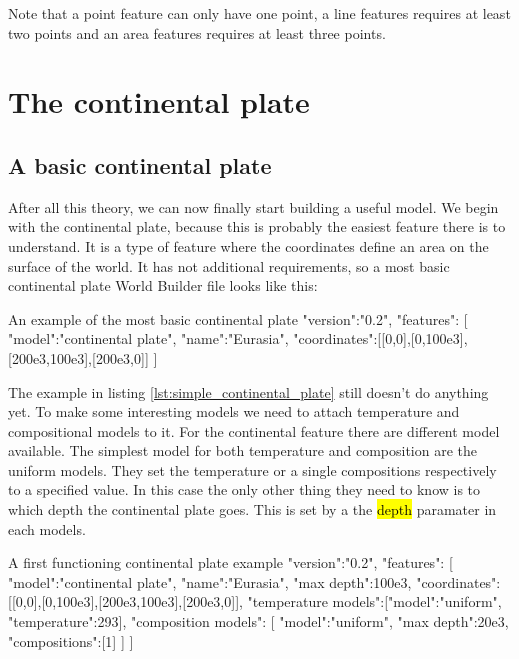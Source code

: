 \documentclass{book}
\newcommand{\WB}{{World Builder}}
\begin{document}
\begin{remark}
Note that a point feature can only have one point, a line features requires at least two points and an area features requires at least three points.
\end{remark}

\section{The continental plate}
\label{section:continetnal_plate}
\subsection{A basic continental plate}
After all this theory, we can now finally start building a useful model. We begin with the continental plate, because this is probably the easiest feature there is to understand. It is a type of feature where the coordinates define an area on the surface of the world. It has not additional requirements, so a most basic continental plate \WB{} file looks like this:

\begin{javascriptcode}[label=lst:simple_continental_plate]{An example of the most basic continental plate}{}
{
  "version":"0.2",
  "features":
  [
    {
      "model":"continental plate", "name":"Eurasia",
      "coordinates":[[0,0],[0,100e3],[200e3,100e3],[200e3,0]]
    }
  ]
}
\end{javascriptcode}

The example in listing \ref{lst:simple_continental_plate} still doesn't do anything yet. To make some interesting models we need to attach temperature and compositional models to it. For the continental feature there are different model available. The simplest model for both temperature and composition are the uniform models. They set the temperature or a single compositions respectively to a specified value. In this case the only other thing they need to know is to which depth the continental plate goes. This is set by a the \hl{depth} paramater in each models.

\begin{javascriptcode}{A first functioning continental plate example}{}
{
  "version":"0.2",
  "features":
  [
    {
      "model":"continental plate", "name":"Eurasia", "max depth":100e3,
      "coordinates":[[0,0],[0,100e3],[200e3,100e3],[200e3,0]],
      "temperature models":[{"model":"uniform", "temperature":293}],
      "composition models":
      [
        {"model":"uniform", "max depth":20e3, "compositions":[1]}
      ]
    }
  ]
}
\end{javascriptcode}
\end{document}
